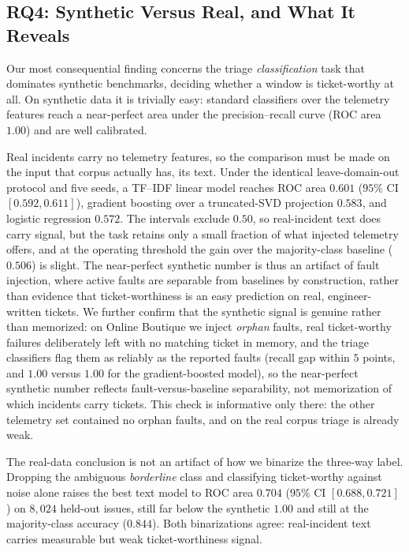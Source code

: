 \subsection{RQ4: Synthetic Versus Real, and What It Reveals}
\label{sec:results-rq4}

Our most consequential finding concerns the triage \emph{classification} task
that dominates synthetic benchmarks, deciding whether a window is ticket-worthy
at all. On synthetic data it is trivially easy: standard classifiers over the
telemetry features reach a near-perfect area under the precision--recall curve
(ROC area $1.00$) and are well calibrated.

Real incidents carry no telemetry features, so the comparison must be made on
the input that corpus actually has, its text. Under the identical
leave-domain-out protocol and five seeds, a TF--IDF linear model reaches ROC
area $0.601$ ($95\%$ CI $[0.592,0.611]$), gradient boosting over a truncated-SVD
projection $0.583$, and logistic regression $0.572$. The intervals exclude
$0.50$, so real-incident text does carry signal, but the task retains only a
small fraction of what injected telemetry offers, and at the operating threshold
the gain over the majority-class baseline ($0.506$) is slight. The near-perfect
synthetic number is thus an artifact of fault injection, where active faults are
separable from baselines by construction, rather than evidence that
ticket-worthiness is an easy prediction on real, engineer-written tickets. We further confirm that the synthetic signal is
genuine rather than memorized: on Online Boutique we inject \emph{orphan} faults,
real ticket-worthy failures deliberately left with no matching ticket in memory, and
the triage classifiers flag them as reliably as the reported faults (recall gap
within $5$ points, and $1.00$ versus $1.00$ for the gradient-boosted model), so the
near-perfect synthetic number reflects fault-versus-baseline separability, not
memorization of which incidents carry tickets. This check is informative only there:
the other telemetry set contained no orphan faults, and on the real corpus triage is
already weak.

The real-data conclusion is not an artifact of how we binarize the three-way
label. Dropping the ambiguous \emph{borderline} class and classifying
ticket-worthy against noise alone raises the best text model to ROC area $0.704$
($95\%$ CI $[0.688,0.721]$) on $8{,}024$ held-out issues, still far below the
synthetic $1.00$ and still at the majority-class accuracy ($0.844$). Both
binarizations agree: real-incident text carries measurable but weak
ticket-worthiness signal.

